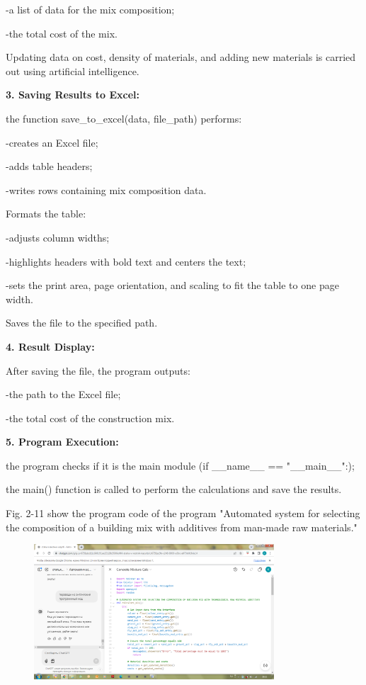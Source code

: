 {-a list of data for the mix composition;

-the total cost of the mix.

Updating data on cost, density of materials, and adding new materials is
carried out using artificial intelligence.

{\bfseries 3. Saving Results to Excel:}

the function save\_to\_excel(data, file\_path) performs:

-creates an Excel file;

-adds table headers;

-writes rows containing mix composition data.

Formats the table:

-adjusts column widths;

-highlights headers with bold text and centers the text;

-sets the print area, page orientation, and scaling to fit the table to
one page width.

Saves the file to the specified path.

{\bfseries 4. Result Display:}

After saving the file, the program outputs:

-the path to the Excel file;

-the total cost of the construction mix.

{\bfseries 5. Program Execution:}

the program checks if it is the main module (if \_\_name\_\_ ==
"\_\_main\_\_":);

the main() function is called to perform the calculations and save the
results.

Fig. 2-11 show the program code of the program "Automated system for
selecting the composition of a building mix with additives from man-made
raw materials."

\begin{figure}[H]
	\centering
	\includegraphics[width=0.8\textwidth]{media/ict3/image3}
	\caption*{}
\end{figure}


}
